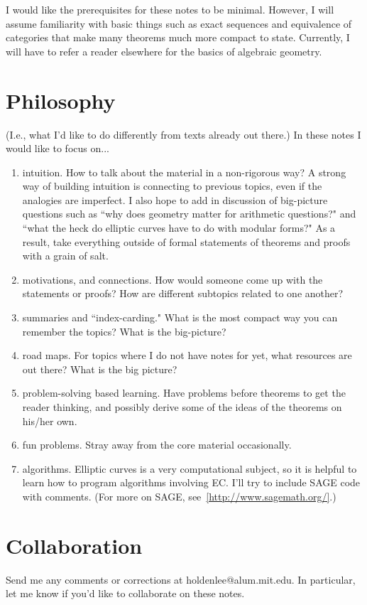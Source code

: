I would like the prerequisites for these notes to be minimal. However, I will assume familiarity with basic things such as exact sequences and equivalence of categories that make many theorems much more compact to state. Currently, I will have to refer a reader elsewhere for the basics of algebraic geometry.

\section*{Philosophy}
(I.e., what I'd like to do differently from texts already out there.)
In these notes I would like to focus on...
\begin{enumerate}
\item
intuition.
How to talk about the material in a non-rigorous way? A strong way of building intuition is connecting to previous topics, even if the analogies are imperfect. I also hope to add in discussion of big-picture questions such as ``why does geometry matter for arithmetic questions?" and ``what the heck do elliptic curves have to do with modular forms?" As a result, take everything outside of formal statements of theorems and proofs with a grain of salt.
\item motivations, and connections.  How would someone come up with the statements or proofs? How are different subtopics related to one another? 
\item
summaries and ``index-carding." What is the most compact way you can remember the topics? What is the big-picture?
\item
road maps. For topics where I do not have notes for yet, what resources are out there? What is the big picture?
\item
problem-solving based learning. Have problems before theorems to get the reader thinking, and possibly derive some of the ideas of the theorems on his/her own.
\item
fun problems. Stray away from the core material occasionally.
\item
algorithms. Elliptic curves is a very computational subject, so it is helpful to learn how to program algorithms involving EC. I'll try to include SAGE code with comments. (For more on SAGE, see~\ref{http://www.sagemath.org/}.)
\end{enumerate}
\section*{Collaboration}
Send me any comments or corrections at holdenlee@alum.mit.edu.
In particular, let me know if you'd like to collaborate on these notes.

